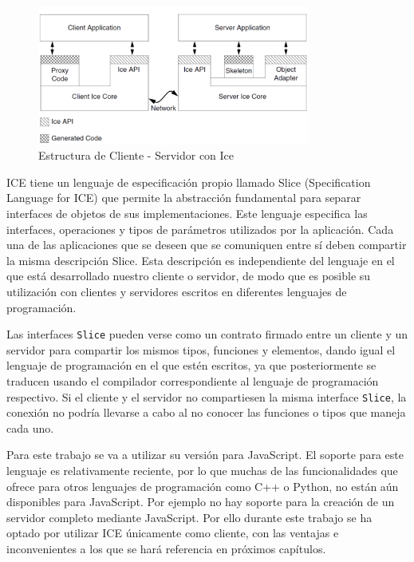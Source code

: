 \begin{figure}[H]
  \begin{center}
    \includegraphics[width=0.8\textwidth]{figures/estructuraice.png}
		\caption{Estructura de Cliente - Servidor con Ice}
		\label{fig.estructurarice}
		\end{center}
\end{figure}

ICE tiene un lenguaje de especificación propio llamado Slice (Specification Language for ICE) que permite la abstracción fundamental para separar interfaces de objetos de sus implementaciones. Este lenguaje especifica las interfaces, operaciones y tipos de parámetros utilizados por la aplicación. Cada una de las aplicaciones que se deseen que se comuniquen entre sí deben compartir la misma descripción Slice. Esta descripción es independiente del lenguaje en el que está desarrollado nuestro cliente o servidor, de modo que es posible su utilización con clientes y servidores escritos en diferentes lenguajes de programación.

Las interfaces \texttt{Slice} pueden verse como un contrato firmado entre un cliente y un servidor para compartir los mismos tipos, funciones y elementos, dando igual el lenguaje de programación en el que estén escritos, ya que posteriormente se traducen usando el compilador correspondiente al lenguaje de programación respectivo. Si el cliente y el servidor no compartiesen la misma interface \texttt{Slice}, la conexión no podría llevarse a cabo al no conocer las funciones o tipos que maneja cada uno.

Para este trabajo se va a utilizar su versión para JavaScript. El soporte para este lenguaje es relativamente reciente, por lo que muchas de las funcionalidades que ofrece para otros lenguajes de programación como C++ o Python, no están aún disponibles para JavaScript. Por ejemplo no hay soporte para la creación de un servidor completo mediante JavaScript. Por ello durante este trabajo se ha optado por utilizar ICE únicamente como cliente, con las ventajas e inconvenientes a los que se hará referencia en próximos capítulos.


